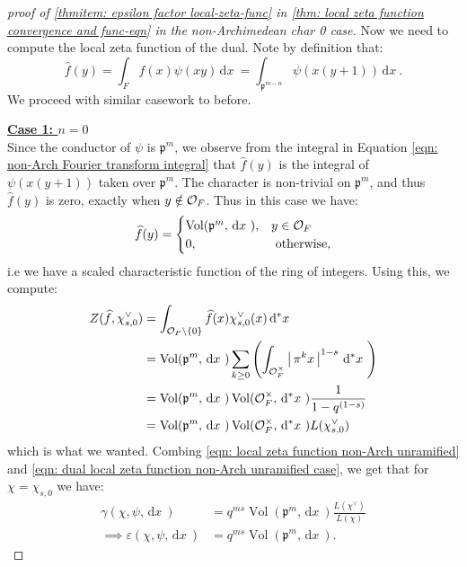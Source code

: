 \documentclass[11pt, x11names]{book}
\newcommand{\pp}{\mathfrak{p}}
\newcommand{\set}[1]{\left\{ #1 \right\}}
\renewcommand{\brack}[1]{\left(   #1 \right)}
\newcommand{\abs}[1]{\left| \, #1  \,\right|}
\renewcommand{\hat}{\widehat}
\newcommand{\dx}{\, \mathrm{d}x \ }
\renewcommand{\d}[1]{\, \mathrm{d}#1 \ }
\DeclareMathOperator{\vol}{Vol}
\begin{document}
\begin{proof}[proof of \ref{thmitem: epsilon factor local-zeta-func} in \ref{thm: local zeta function convergence and func-eqn} in the non-Archimedean char 0 case]
Now we need to compute the local zeta function of the dual. Note by definition that:
\begin{equation}
\label{eqn: non-Arch Fourier transform integral}
    \hat{f}(y) = \int_F f(x)\psi(xy) \dx = \int_{\pp^{m-n}} \psi(x(y+1)) \dx. 
\end{equation}
We proceed with similar casework to before.

\underline{\textbf{Case 1: $n=0$}}\\
Since the conductor of $\psi$ is $\pp^m$, we observe from the integral in Equation \ref{eqn: non-Arch Fourier transform integral} that $\hat{f}(y)$ is the integral of $\psi(x(y+1))$ taken over $\pp^m$. The character is non-trivial on $\pp^m$, and thus $\hat{f}(y)$ is zero, exactly when $y \notin \mathcal{O}_F$. Thus in this case we have:
\begin{equation*}
    \hat{f}(y) = \begin{cases}
    \vol(\pp^m, \dx), & y \in \calo_F\\
    0, & \text{ otherwise},
    \end{cases}
\end{equation*}
i.e we have a scaled characteristic function of the ring of integers. Using this, we compute:
\begin{align}
\label{eqn: dual local zeta function non-Arch unramified case}
    Z(\hat{f}, \chi^\lor_{s, 0}) &= \int_{\calo_F \setminus \set{0}} \hat{f}(x) \chi^\lor_{s, 0}(x) \d{^*x} \nonumber \\
    &= \vol(\pp^m, \dx) \sum_{k \geq 0} \brack{\int_{\calo_F^\times} \abs{\pi^k x}^{1-s} \d{^*x}} \nonumber \\
    &= \vol(\pp^m, \dx) \vol(\calo_F^\times, \d{^*x}) \frac{1}{1 - q^{(1-s)}} \nonumber \\
    &= \vol(\pp^m, \dx) \vol(\calo_F^\times, \d{^*x}) L(\chi^\lor_{s, 0})
\end{align}
which is what we wanted. Combing \ref{eqn: local zeta function non-Arch unramified} and \ref{eqn: dual local zeta function non-Arch unramified case}, we get that for $\chi = \chi_{s, 0}$ we have:
\begin{align}
\label{eqn: local epsilon factor non-Arch unramified}
    \gamma(\chi, \psi, \dx) &= q^{ms} \vol(\pp^m, \dx) \frac{L(\chi^\lor)}{L(\chi)} \nonumber \\
    \implies \varepsilon(\chi, \psi, \dx) &= q^{ms}\vol(\pp^m, \dx).
\end{align}


\end{proof}
\end{document}
